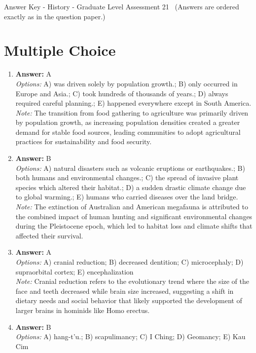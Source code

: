 \documentclass[12pt]{article}
\begin{document}
\begin{center}
Answer Key - History - Graduate Level Assessment 21 \
\small (Answers are ordered exactly as in the question paper.)
\end{center}

\section*{Multiple Choice}
\begin{enumerate}[label=\arabic*.]
\item \textbf{Answer:} A
\\ \textit{Options:} A) was driven solely by population growth.; B) only occurred in Europe and Asia.; C) took hundreds of thousands of years.; D) always required careful planning.; E) happened everywhere except in South America.
\\ \textit{Note:} The transition from food gathering to agriculture was primarily driven by population growth, as increasing population densities created a greater demand for stable food sources, leading communities to adopt agricultural practices for sustainability and food security.
\item \textbf{Answer:} B
\\ \textit{Options:} A) natural disasters such as volcanic eruptions or earthquakes.; B) both humans and environmental changes.; C) the spread of invasive plant species which altered their habitat.; D) a sudden drastic climate change due to global warming.; E) humans who carried diseases over the land bridge.
\\ \textit{Note:} The extinction of Australian and American megafauna is attributed to the combined impact of human hunting and significant environmental changes during the Pleistocene epoch, which led to habitat loss and climate shifts that affected their survival.
\item \textbf{Answer:} A
\\ \textit{Options:} A) cranial reduction; B) decreased dentition; C) microcephaly; D) supraorbital cortex; E) encephalization
\\ \textit{Note:} Cranial reduction refers to the evolutionary trend where the size of the face and teeth decreased while brain size increased, suggesting a shift in dietary needs and social behavior that likely supported the development of larger brains in hominids like Homo erectus.
\item \textbf{Answer:} B
\\ \textit{Options:} A) hang-t'u.; B) scapulimancy; C) I Ching; D) Geomancy; E) Kau Cim

\end{enumerate}
\end{document}
